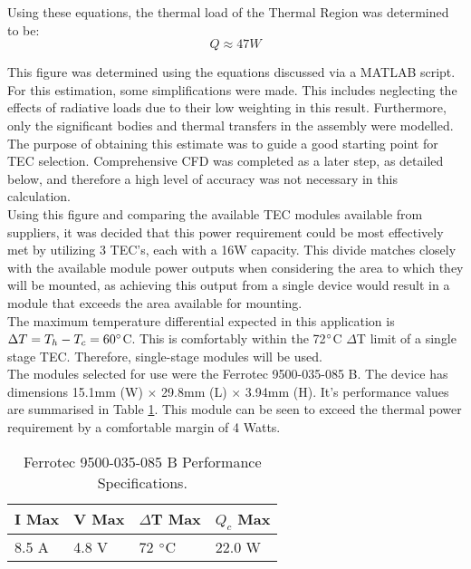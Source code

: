 Using these equations, the thermal load of the Thermal Region was determined to be:
$$ Q \approx 47 W $$

This figure was determined using the equations discussed via a MATLAB script. For this estimation, some simplifications were made. This includes neglecting the effects of radiative loads due to their low weighting in this result. Furthermore, only the significant bodies and thermal transfers in the assembly were modelled. The purpose of obtaining this estimate was to guide a good starting point for TEC selection. Comprehensive CFD was completed as a later step, as detailed below, and therefore a high level of accuracy was not necessary in this calculation.\\

Using this figure and comparing the available TEC modules available from suppliers, it was decided that this power requirement could be most effectively met by utilizing 3 TEC's, each with a 16W capacity. This divide matches closely with the available module power outputs when considering the area to which they will be mounted, as achieving this output from a single device would result in a module that exceeds the area available for mounting.\\
	
The maximum temperature differential expected in this application is $\Delta T = T_h - T_c = 60\degree$C. This is comfortably within the 72$\degree$C $\Delta$T limit of a single stage TEC. Therefore, single-stage modules will be used.\\

The modules selected for use were the Ferrotec 9500-035-085 B. The device has dimensions 15.1mm (W) $\times$ 29.8mm (L) $\times$ 3.94mm (H). It's performance values are summarised in Table \ref{tab:TECspec}. This module can be seen to exceed the thermal power requirement by a comfortable margin of 4 Watts.

\begin{table}[h!]
	\begin{center}
		\begin{tabular}{ p{3.15cm} |  p{3.15cm} | p{3.15cm} | p{3.15cm } }
			\hline
			I Max & V Max & $\Delta$T Max & $Q_c$ Max\\ \hline \hline
			8.5 A & 4.8 V & 72 $\degree$C & 22.0 W\\ \hline
		\end{tabular}
	\end{center}
	\caption[Ferrotec 9500-035-085 B Performance Specifications.]{Ferrotec 9500-035-085 B Performance Specifications.}
	\label{tab:TECspec}
\end{table}

